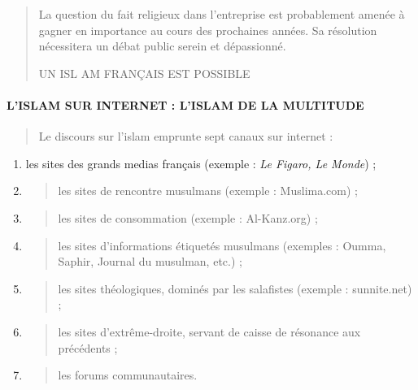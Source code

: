 \begin{quote}
La question du fait religieux dans l'entreprise est probablement amenée
à gagner en importance au cours des prochaines années. Sa résolution
nécessitera un débat public serein et dépassionné.

UN ISL AM FRANÇAIS EST POSSIBLE
\end{quote}

\hypertarget{lislam-sur-internet-lislam-de-la-multitude}{%
\paragraph{L'ISLAM SUR INTERNET : L'ISLAM DE LA
MULTITUDE}\label{lislam-sur-internet-lislam-de-la-multitude}}

\begin{quote}
Le discours sur l'islam emprunte sept canaux sur internet :
\end{quote}

\begin{enumerate}
\def\labelenumi{\alph{enumi}.}
\item
  les sites des grands medias français (exemple : \emph{Le Figaro, Le
  Monde}) ;
\item
  \begin{quote}
  les sites de rencontre musulmans (exemple : Muslima.com) ;
  \end{quote}
\item
  \begin{quote}
  les sites de consommation (exemple : Al-Kanz.org) ;
  \end{quote}
\item
  \begin{quote}
  les sites d'informations étiquetés musulmans (exemples : Oumma,
  Saphir, Journal du musulman, etc.) ;
  \end{quote}
\item
  \begin{quote}
  les sites théologiques, dominés par les salafistes (exemple :
  sunnite.net) ;
  \end{quote}
\item
  \begin{quote}
  les sites d'extrême-droite, servant de caisse de résonance aux
  précédents ;
  \end{quote}
\item
  \begin{quote}
  les forums communautaires.
  \end{quote}
\end{enumerate}

